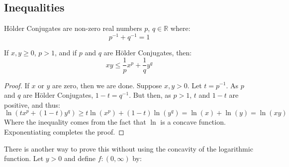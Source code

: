         \subsection{Inequalities}
            \begin{definition}
                H\"{o}lder Conjugates are non-zero real numbers
                $p$, $q\in\mathbb{R}$ where:
                \begin{equation}
                    p^{-1}+q^{-1}=1
                \end{equation}
            \end{definition}
            \begin{theorem}
                If $x,y\geq{0}$, $p>1$, and if $p$ and $q$
                are H\"{o}lder Conjugates, then:
                \begin{equation}
                    xy\leq{\frac{1}{p}x^{p}+\frac{1}{q}y^{q}}
                \end{equation}
            \end{theorem}
            \begin{proof}
                If $x$ or $y$ are zero, then we are done.
                Suppose $x,y>0$. Let $t=p^{-1}$. As $p$ and
                $q$ are H\"{o}lder Conjugates,
                $1-t=q^{-1}$. But then, as $p>1$,
                $t$ and $1-t$ are positive, and thus:
                \begin{equation}
                    \ln(tx^{p}+(1-t)y^{q})
                    \geq{t}\ln(x^{p})+(1-t)\ln(y^{q})
                    =\ln(x)+\ln(y)=\ln(xy)
                \end{equation}
                Where the inequality comes from the fact
                that $\ln$ is a concave function.
                Exponentiating completes the proof.
            \end{proof}
            There is another way to prove this without using
            the concavity of the logarithmic function.
            Let $y>0$ and define $f:(0,\infty)$ by:
